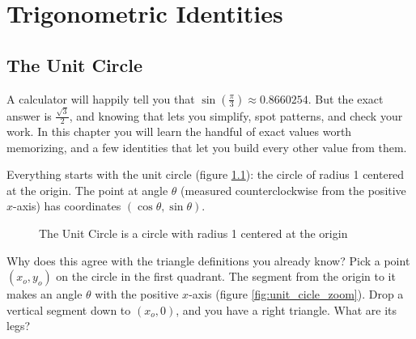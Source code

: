 \chapter{Trigonometric Identities}

\section{The Unit Circle}
A calculator will happily tell you that $\sin(\frac{\pi}{3}) \approx
0.8660254$. But the exact answer is $\frac{\sqrt{3}}{2}$, and knowing that
lets you simplify, spot patterns, and check your work. In this chapter you
will learn the handful of exact values worth memorizing, and a few
identities that let you build every other value from them.

Everything starts with the unit circle (figure
\ref{fig:unit_cicle_blank}): the circle of radius 1 centered at the origin.
The point at angle $\theta$ (measured counterclockwise from the positive
$x$-axis) has coordinates $(\cos\theta, \sin\theta)$. 

\begin{figure}[H]
    \centering
    \caption{The Unit Circle is a circle with radius 1 centered at the origin}
    \label{fig:unit_cicle_blank}
\end{figure}

Why does this agree with the triangle definitions you already know? Pick a
point $(x_o, y_o)$ on the circle in the first quadrant. The segment from
the origin to it makes an angle $\theta$ with the positive $x$-axis (figure
\ref{fig:unit_cicle_zoom}). Drop a vertical segment down to $(x_o, 0)$,
and you have a right triangle. What are its legs?

